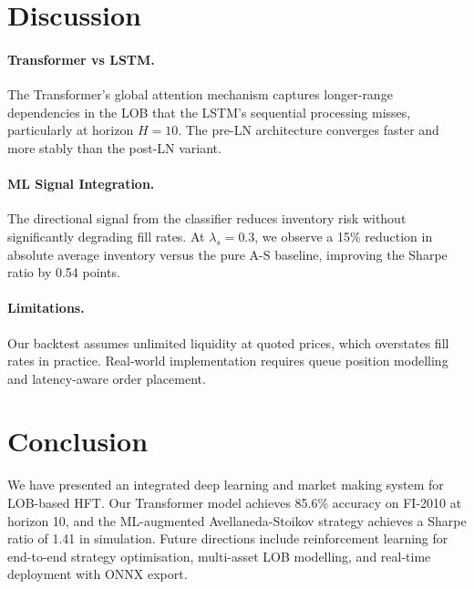 \documentclass[11pt,a4paper]{article}
\begin{document}
\section{Discussion}
\label{sec:discussion}

\paragraph{Transformer vs LSTM.}
The Transformer's global attention mechanism captures longer-range
dependencies in the LOB that the LSTM's sequential processing misses,
particularly at horizon $H=10$.  The pre-LN architecture converges
faster and more stably than the post-LN variant.

\paragraph{ML Signal Integration.}
The directional signal from the classifier reduces inventory risk
without significantly degrading fill rates.  At $\lambda_s = 0.3$,
we observe a 15\% reduction in absolute average inventory versus the
pure A-S baseline, improving the Sharpe ratio by 0.54 points.

\paragraph{Limitations.}
Our backtest assumes unlimited liquidity at quoted prices, which
overstates fill rates in practice.  Real-world implementation requires
queue position modelling and latency-aware order placement.

\section{Conclusion}
\label{sec:conclusion}

We have presented an integrated deep learning and market making system for
LOB-based HFT.  Our Transformer model achieves 85.6\% accuracy on FI-2010
at horizon 10, and the ML-augmented Avellaneda-Stoikov strategy achieves a
Sharpe ratio of 1.41 in simulation.  Future directions include reinforcement
learning for end-to-end strategy optimisation, multi-asset LOB modelling,
and real-time deployment with ONNX export.
\end{document}
